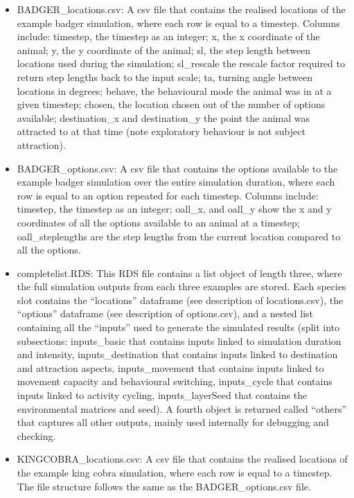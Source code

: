 \documentclass[10pt,a4paper]{article}
\begin{document}
\begin{itemize}
\item
  BADGER\_locations.csv: A csv file that contains the realised locations of the example badger simulation, where each row is equal to a timestep. Columns include: timestep, the timestep as an integer; x, the x coordinate of the animal; y, the y coordinate of the animal; sl, the step length between locations used during the simulation; sl\_rescale the rescale factor required to return step lengths back to the input scale; ta, turning angle between locations in degrees; behave, the behavioural mode the animal was in at a given timestep; chosen, the location chosen out of the number of options available; destination\_x and destination\_y the point the animal was attracted to at that time (note exploratory behaviour is not subject attraction).
\item
  BADGER\_options.csv: A csv file that contains the options available to the example badger simulation over the entire simulation duration, where each row is equal to an option repeated for each timestep. Columns include: timestep, the timestep as an integer; oall\_x, and oall\_y show the x and y coordinates of all the options available to an animal at a timestep; oall\_steplengths are the step lengths from the current location compared to all the options.
\item
  completelist.RDS: This RDS file contains a list object of length three, where the full simulation outputs from each three examples are stored. Each species slot contains the ``locations'' dataframe (see description of locations.csv), the ``options'' dataframe (see description of options.csv), and a nested list containing all the ``inputs'' used to generate the simulated results (split into subsections: inputs\_basic that contains inputs linked to simulation duration and intensity, inputs\_destination that contains inputs linked to destination and attraction aspects, inputs\_movement that contains inputs linked to movement capacity and behavioural switching, inputs\_cycle that contains inputs linked to activity cycling, inputs\_layerSeed that contains the environmental matrices and seed). A fourth object is returned called ``others'' that captures all other outputs, mainly used internally for debugging and checking.
\item
  KINGCOBRA\_locations.csv: A csv file that contains the realised locations of the example king cobra simulation, where each row is equal to a timestep. The file structure follows the same as the BADGER\_options.csv file.

\end{itemize}
\end{document}
